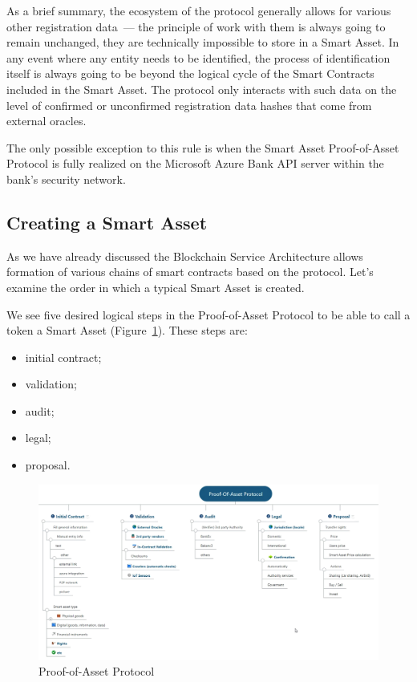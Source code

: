 \documentclass{article}
\begin{document}
\begin{multicols}{2}
As a brief summary, the ecosystem of the protocol generally allows for various other registration data~--- the principle of work with them is always going to remain unchanged, they are technically impossible to store in a Smart Asset. In any event where any entity needs to be identified, the process of identification itself is always going to be beyond the logical cycle of the Smart Contracts included in the Smart Asset. The protocol only interacts with such data on the level of confirmed or unconfirmed registration data hashes that come from external oracles. 

The only possible exception to this rule is when the Smart Asset Proof-of-Asset Protocol is fully realized on the Microsoft Azure Bank API server within the bank’s security network.

\subsection{Creating a Smart Asset}

As we have already discussed the Blockchain Service Architecture allows formation of various chains of smart contracts based on the protocol. Let's examine the order in which a typical Smart Asset is created.

We see five desired logical steps in the Proof-of-Asset Protocol to be able to call a token a Smart Asset (Figure~\ref{fig:poa-protocol}). These steps are:

\begin{itemize}
\item initial contract;
\item validation;
\item audit;
\item legal;
\item proposal.
\end{itemize}

\begin{figure}
  \centering
  \includegraphics[width=\textwidth]{poa-protocol.png}
  \caption{Proof-of-Asset Protocol}
  \label{fig:poa-protocol}
\end{figure}


\end{multicols}
\end{document}
